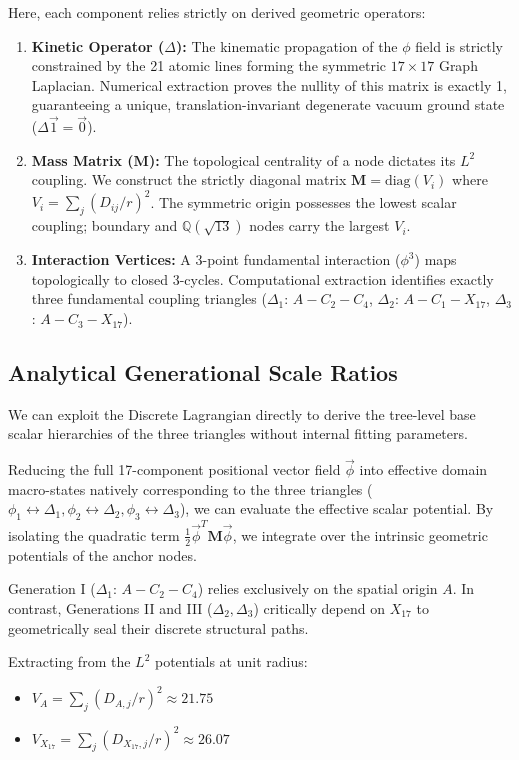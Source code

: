 \documentclass[12pt, a4paper]{article}
\begin{document}
Here, each component relies strictly on derived geometric operators:
\begin{enumerate}
    \item \textbf{Kinetic Operator ($\Delta$):} The kinematic propagation of the $\phi$ field is strictly constrained by the 21 atomic lines forming the symmetric $17\times 17$ Graph Laplacian. Numerical extraction proves the nullity of this matrix is exactly 1, guaranteeing a unique, translation-invariant degenerate vacuum ground state ($\Delta \vec{1} = \vec{0}$).
    \item \textbf{Mass Matrix ($\mathbf{M}$):} The topological centrality of a node dictates its $L^2$ coupling. We construct the strictly diagonal matrix $\mathbf{M} = \text{diag}(V_i)$ where $V_i = \sum_{j} (D_{ij}/r)^2$. The symmetric origin possesses the lowest scalar coupling; boundary and $\mathbb{Q}(\sqrt{13})$ nodes carry the largest $V_i$.
    \item \textbf{Interaction Vertices:} A 3-point fundamental interaction ($\phi^3$) maps topologically to closed 3-cycles. Computational extraction identifies exactly three fundamental coupling triangles ($\Delta_1$: $A-C_2-C_4$, $\Delta_2$: $A-C_1-X_{17}$, $\Delta_3$: $A-C_3-X_{17}$). 
\end{enumerate}

\subsection{Analytical Generational Scale Ratios}

We can exploit the Discrete Lagrangian directly to derive the tree-level base scalar hierarchies of the three triangles without internal fitting parameters. 

Reducing the full 17-component positional vector field $\vec{\phi}$ into effective domain macro-states natively corresponding to the three triangles ($\phi_1 \leftrightarrow \Delta_1, \phi_2 \leftrightarrow \Delta_2, \phi_3 \leftrightarrow \Delta_3$), we can evaluate the effective scalar potential. By isolating the quadratic term $\frac{1}{2} \vec{\phi}^T \mathbf{M} \vec{\phi}$, we integrate over the intrinsic geometric potentials of the anchor nodes. 

Generation I ($\Delta_1$: $A-C_2-C_4$) relies exclusively on the spatial origin $A$. In contrast, Generations II and III ($\Delta_2, \Delta_3$) critically depend on $X_{17}$ to geometrically seal their discrete structural paths.

Extracting from the $L^2$ potentials at unit radius:
\begin{itemize}
    \item $V_A = \sum_j (D_{A,j}/r)^2 \approx 21.75$
    \item $V_{X_{17}} = \sum_j (D_{X_{17},j}/r)^2 \approx 26.07$
\end{itemize}
\end{document}
